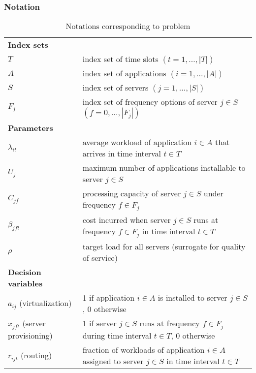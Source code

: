 \subsubsection{Notation}
\begin{table}[H]
	\caption{Notations corresponding to problem}
	\label{notation}
	\resizebox{\textwidth}{!}
	{
		\begin{tabular}{ll}
			\toprule
			\textbf{Index sets} &  \\ 
			$T$ & \textrm{index set of time slots $(t=1,\ldots,|T|)$} \\ 
			$A$ & \textrm{index set of applications $(i=1,\ldots,|A|)$} \\ 
			$S$ & \textrm{index set of servers $(j=1,\ldots,|S|)$}\\
			$F_j$ & \textrm{index set of frequency options of server $j\in S$ $(f=0,\ldots,|F_j|)$} \\ 
			\textbf{Parameters} &   \\ 
			$\lambda_{it}$ & \textrm{average workload of application $i\in A$ that arrives in time interval $t\in T$} \\ 
			$U_j$  & \textrm{maximum number of applications installable to server $j\in S$} \\ 
			$C_{jf}$ & \textrm{processing capacity of server $j\in S$ under frequency $f\in F_j$} \\ 
			$\beta_{jft}$ & \textrm{cost incurred when server $j\in S$ runs at frequency $f\in F_j$ in time interval $t\in T$} \\ 
			$\rho$ & \textrm{target load for all servers (surrogate for quality of service)}\\ 
			\textbf{Decision variables} &  \\ 
			$a_{ij}$ (virtualization) & \textrm{1 if application $i\in A$ is installed to server $j\in S$, 0 otherwise} \\ 
			$x_{jft}$ (server provisioning) & \textrm{1 if server $j\in S$ runs at frequency $f\in F_j$ during time interval $t\in T$, 0 otherwise} \\ 
			$r_{ijt}$ (routing) & \textrm{fraction of workloads of application $i\in A$ assigned to server $j\in S$ in time  interval $t\in T$}\\
			\hline
		\end{tabular}
	}
\end{table} 


